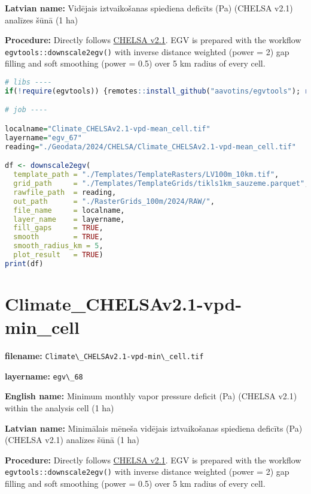 \documentclass[
]{book}
\newcommand{\passthrough}[1]{#1}
\begin{document}
\textbf{Latvian name:} Vidējais iztvaikošanas spiediena deficīts (Pa) (CHELSA v2.1) analīzes šūnā (1 ha)

\textbf{Procedure:} Directly follows \hyperref[Ch04.11]{CHELSA v2.1}. EGV is prepared with the
workflow \passthrough{\lstinline!egvtools::downscale2egv()!} with inverse distance weighted (power = 2)
gap filling and soft smoothing (power = 0.5) over 5 km radius of every cell.

\begin{lstlisting}[language=R]
# libs ----
if(!require(egvtools)) {remotes::install_github("aavotins/egvtools"); require(egvtools)}

# job ----

localname="Climate_CHELSAv2.1-vpd-mean_cell.tif"
layername="egv_67"
reading="./Geodata/2024/CHELSA/Climate_CHELSAv2.1-vpd-mean_cell.tif"

df <- downscale2egv(
  template_path = "./Templates/TemplateRasters/LV100m_10km.tif",
  grid_path     = "./Templates/TemplateGrids/tikls1km_sauzeme.parquet",
  rawfile_path  = reading,
  out_path      = "./RasterGrids_100m/2024/RAW/",
  file_name     = localname,
  layer_name    = layername,
  fill_gaps     = TRUE,
  smooth        = TRUE,
  smooth_radius_km = 5,
  plot_result   = TRUE)
print(df)
\end{lstlisting}

\section{Climate\_CHELSAv2.1-vpd-min\_cell}\label{ch06.068}

\textbf{filename:} \passthrough{\lstinline!Climate\_CHELSAv2.1-vpd-min\_cell.tif!}

\textbf{layername:} \passthrough{\lstinline!egv\_68!}

\textbf{English name:} Minimum monthly vapor pressure deficit (Pa) (CHELSA v2.1) within the analysis cell (1 ha)

\textbf{Latvian name:} Minimālais mēneša vidējais iztvaikošanas spiediena deficīts (Pa) (CHELSA v2.1) analīzes šūnā (1 ha)

\textbf{Procedure:} Directly follows \hyperref[Ch04.11]{CHELSA v2.1}. EGV is prepared with the
workflow \passthrough{\lstinline!egvtools::downscale2egv()!} with inverse distance weighted (power = 2)
gap filling and soft smoothing (power = 0.5) over 5 km radius of every cell.
\end{document}
